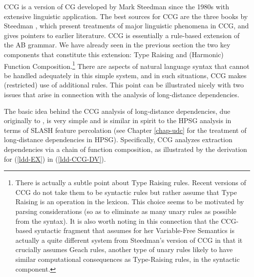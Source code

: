 \documentclass[output=paper]{langsci/langscibook}
\begin{document}
CCG is a version of CG developed by Mark Steedman since the 1980s with
extensive linguistic application. The best sources for CCG are the
three books by Steedman \citep{Steedman97a,Steedman2000a-u,steedman2012},
which present treatments of major linguistic phenomena in CCG, and
gives pointers to earlier literature. CCG is essentially a rule-based
extension of the AB grammar. We have already seen in the previous
section the two key components that constitute this extension: Type
Raising and (Harmonic) Function Composition.\footnote{There is
actually a subtle point about Type Raising rules. Recent
versions of CCG \citep{steedman2012} do not take them to be syntactic rules
but rather assume that Type Raising is an operation in the lexicon.
This choice seems to be motivated by 
parsing considerations (so as to eliminate as  many unary rules as
possible from the syntax). It is also worth noting in this
connection that the CCG-based syntactic fragment that
\citet{jacobson1999a,jacobson2000a} assumes for her Variable-Free Semantics
is actually a quite different system from Steedman's version of CCG in
that it crucially assumes Geach rules, another type of unary rules
likely to have similar computational consequences as Type-Raising rules, in the syntactic
component.} There are aspects of natural language syntax that cannot
be handled adequately in this simple system, and in such situations,
CCG makes (restricted) use of additional rules. This point can be
illustrated nicely with two issues that arise in connection with the
analysis of long-distance dependencies.

The basic idea behind the CCG analysis of long-distance dependencies,
due originally to \citet{AS82a}, is very simple and is similar in spirit to
the HPSG analysis in terms of SLASH feature percolation (see Chapter \ref{chap-udc}
for the treatment of long-distance dependencies in HPSG). Specifically,
CCG analyzes extraction dependencies via a chain of function
composition, as illustrated by the derivation for (\ref{ldd-EX}) in (\ref{ldd-CCG-DV}).
\end{document}
